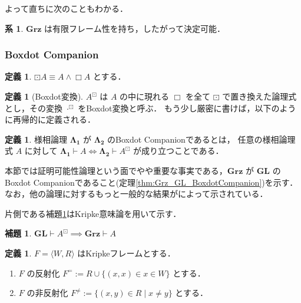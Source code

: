 \documentclass{jsarticle}
\newcommand*{\Logic}[1]{\mathbf{#1}}
\newcommand*{\LogicGL}{\Logic{GL}}
\newcommand*{\LogicGrz}{\Logic{Grz}}
\newcommand*{\structure}[1]{\langle #1 \rangle}
\theoremstyle{definition}
\newtheorem{lemma}[theorem]{補題}
\newtheorem{definition}[theorem]{定義}
\newtheorem{corollary}[theorem]{系}
\begin{document}
よって直ちに次のこともわかる．

\begin{corollary}
	$\LogicGrz$ は有限フレーム性を持ち，したがって決定可能．
\end{corollary}

\subsubsection{Boxdot Companion}

\begin{definition}
	$\boxdot A \equiv A \land \Box A$ とする．
\end{definition}

\begin{definition}[Boxdot変換]
	$A^\boxdot$ は $A$ の中に現れる $\Box$ を全て $\boxdot$ で置き換えた論理式とし，その変換 $\cdot^\boxdot$ をBoxdot変換と呼ぶ．
	もう少し厳密に書けば，以下のように再帰的に定義される．
\end{definition}

\begin{definition}
	様相論理 $\Logic{\Lambda_1}$ が $\Logic{\Lambda_2}$ のBoxdot Companionであるとは，
	任意の様相論理式 $A$ に対して $\Logic{\Lambda_1} \vdash A \iff \Logic{\Lambda_2} \vdash A^\boxdot$ が成り立つことである．
\end{definition}

本節では証明可能性論理という面でやや重要な事実である，$\LogicGrz$ が $\LogicGL$ のBoxdot Companionであること(定理\ref{thm:Grz_GL_BoxdotCompanion})を示す．
なお，他の論理に対するもっと一般的な結果が\cite*{jerabek_cluster_2016}によって示されている．

片側である補題\ref{lem:Grz_GL_BoxdotCompanion_1}はKripke意味論を用いて示す．

\begin{lemma}\label{lem:Grz_GL_BoxdotCompanion_1}
	$\LogicGL \vdash A^\boxdot \implies \LogicGrz \vdash A$
\end{lemma}

\newcommand*{\reflexv}[1]{#1^{=}}
\newcommand*{\irreflxv}[1]{#1^{\neq}}

\begin{definition}
	$F = \structure{W, R}$ はKripkeフレームとする．
	\begin{enumerate}
		\item $F$ の反射化 $\reflexv{F} := R \cup \{ (x, x) \in x \in W\}$ とする．
		\item $F$ の非反射化 $\irreflxv{F} := \{(x,y) \in R \mid x \neq y \}$ とする．
	\end{enumerate}
\end{definition}
\end{document}
